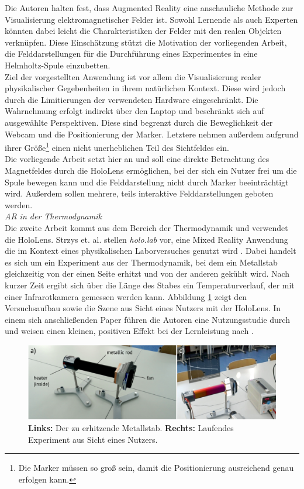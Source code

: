 Die Autoren halten fest, dass Augmented Reality eine anschauliche Methode zur Visualisierung elektromagnetischer Felder ist. Sowohl Lernende als auch Experten könnten dabei leicht die Charakteristiken der Felder mit den realen Objekten verknüpfen. Diese Einschätzung stützt die Motivation der vorliegenden Arbeit, die Felddarstellungen für die Durchführung eines Experimentes in eine Helmholtz-Spule einzubetten.\\

Ziel der vorgestellten Anwendung ist vor allem die Visualisierung realer physikalischer Gegebenheiten in ihrem natürlichen Kontext. Diese wird jedoch durch die Limitierungen der verwendeten Hardware eingeschränkt. Die Wahrnehmung erfolgt indirekt über den Laptop und beschränkt sich auf ausgewählte Perspektiven. Diese sind begrenzt durch die Beweglichkeit der Webcam und die Positionierung der Marker. Letztere nehmen außerdem aufgrund ihrer Größe\footnote{Die Marker müssen so groß sein, damit die Positionierung ausreichend genau erfolgen kann.} einen nicht unerheblichen Teil des Sichtfeldes ein.\\

Die vorliegende Arbeit setzt hier an und soll eine direkte Betrachtung des Magnetfeldes durch die HoloLens ermöglichen, bei der sich ein Nutzer frei um die Spule bewegen kann und die Felddarstellung nicht durch Marker beeinträchtigt wird. Außerdem sollen mehrere, teils interaktive Felddarstellungen geboten werden.\\

\textit{AR in der Thermodynamik}\\
Die zweite Arbeit kommt aus dem Bereich der Thermodynamik und verwendet die HoloLens. Strzys et. al. stellen \textit{holo.lab} vor, eine Mixed Reality Anwendung die im Kontext eines physikalischen Laborversuches genutzt wird \cite{Strzys17}. Dabei handelt es sich um ein Experiment aus der Thermodynamik, bei dem ein Metallstab gleichzeitig von der einen Seite erhitzt und von der anderen gekühlt wird. Nach kurzer Zeit ergibt sich über die Länge des Stabes ein Temperaturverlauf, der mit einer Infrarotkamera gemessen werden kann. Abbildung \ref{img:Strzys17} zeigt den Versuchsaufbau sowie die Szene aus Sicht eines Nutzers mit der HoloLens. In einem sich anschließenden Paper führen die Autoren eine Nutzungsstudie durch und weisen einen kleinen, positiven Effekt bei der Lernleistung nach \cite{Strzys18}.\\

\begin{figure}[h!]
	\centering
	\includegraphics[width=1\textwidth]{images/Strzys18.png}
	\caption{\textbf{Links:} Der zu erhitzende Metallstab.\textbf{ Rechts:} Laufendes Experiment aus Sicht eines Nutzers. \cite{Strzys17}}
	\label{img:Strzys17}
\end{figure}

